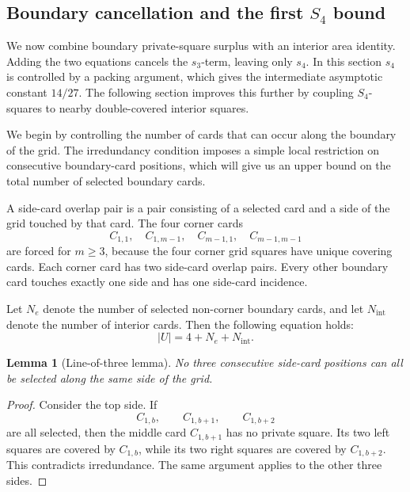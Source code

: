 \documentclass[11pt]{article}
\newtheorem{lemma}[theorem]{Lemma}
\begin{document}
	\subsection{Boundary cancellation and the first \texorpdfstring{\(S_4\)}{S4} bound}
	
	We now combine boundary private-square surplus with an interior area identity.
	Adding the two equations cancels the \(s_3\)-term, leaving only \(s_4\).  In
	this section \(s_4\) is controlled by a packing argument, which gives the
	intermediate asymptotic constant \(14/27\).  The following section improves
	this further by coupling \(S_4\)-squares to nearby double-covered interior
	squares.
	
	We begin by controlling the number of cards that can occur along the boundary of the grid. The irredundancy condition imposes a simple local restriction on consecutive boundary-card positions, which will give us an upper bound on the total number of selected boundary cards.
	
	A side-card overlap pair is a pair consisting of a
	selected card and a side of the grid touched by that card.  The four corner
	cards
	\[
	C_{1,1},\quad C_{1,m-1},\quad C_{m-1,1},\quad C_{m-1,m-1}
	\]
	are forced for \(m\ge3\), because the four corner grid squares have unique
	covering cards.  Each corner card has two side-card overlap pairs.  Every other
	boundary card touches exactly one side and has one side-card incidence.
	
	Let \(N_e\) denote the number of selected non-corner boundary cards, and let
	\(N_{\mathrm{int}}\) denote the number of interior cards. Then the following equation holds:
	\begin{equation}
		|U|=4+N_e+N_{\mathrm{int}}.
		\label{eq:N-split}
	\end{equation}
	
	\begin{lemma}[Line-of-three lemma]
		No three consecutive side-card positions can all be selected along the same side of the grid.
	\end{lemma}
	
	\begin{proof}
		Consider the top side. If
		\[
		C_{1,b},\qquad C_{1,b+1},\qquad C_{1,b+2}
		\]
		are all selected, then the middle card \(C_{1,b+1}\) has no private square. Its two left squares are covered by \(C_{1,b}\), while its two right squares are covered by \(C_{1,b+2}\). This contradicts irredundance. The same argument applies to the other three sides.
	\end{proof}
	
\end{document}
